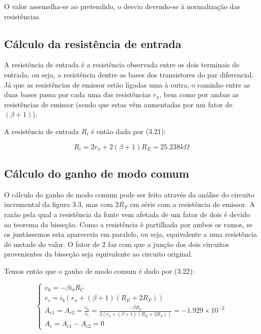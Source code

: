 \documentclass[a4paper,2pt]{report}
\begin{document}
\par O valor assemelha-se ao pretendido, o desvio devendo-se à normalização das resistências.

\subsection{Cálculo da resistência de entrada}

\par A resistência de entrada é a resistência observada entre os dois terminais de entrada, ou seja, a resistência dentre as bases dos transistores do par diferencial. Já que as resistências de emissor estão ligadas uma à outra, o caminho entre as duas bases passa por cada uma das resistências \(r_\pi\), bem como por ambas as resistências de emissor (sendo que estas vêm aumentadas por um fator de \((\beta + 1)\)).
\par A resistência de entrada \(R_i\) é então dada por (3.21):

\begin{equation}
    R_i = 2r_\pi + 2(\beta + 1)R_E = 25.238k\Omega
\end{equation}

\subsection{Cálculo do ganho de modo comum}

\par O cálculo do ganho de modo comum pode ser feito através da análise do circuito incremental da figura 3.3, mas com \(2R_F\) em série com a resistência de emissor. A razão pela qual a resistência da fonte vem afetada de um fator de dois é devido ao teorema da bisseção. Como a resistência é partilhada por ambos os ramos, se os juntássemos esta apareceria em paralelo, ou seja, equivalente a uma resistência de metade do valor. O fator de 2 faz com que a junção dos dois circuitos provenientes da bisseção seja equivalente ao circuito original.

\par Temos então que o ganho de modo comum é dado por (3.22):

\begin{equation}
    \begin{cases}
        v_0 = -\beta i_b R_C \\
        v_c = i_b(r_\pi + (\beta + 1)(R_E + 2R_F)) \\
        A_{c1} = A_{c2} = \frac{v_0}{v_c} = \frac{-\beta R_C}{2(r_\pi + (\beta + 1)(R_E + 2R_F))} = -1.929\times10^{-2} \\
        A_c = A_{c1} - A_{c2} = 0
    \end{cases}
\end{equation}
\end{document}
